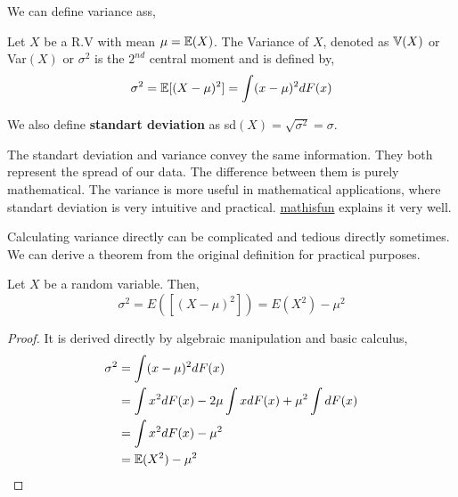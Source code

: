 We can define variance ass,
\begin{definition}
    Let $X$ be a R.V with mean $\mu = {\mathbb{E}}(X)$. The Variance of $X$, denoted as ${\mathbb{V}}(X)$ or  Var$(X)$ or $\sigma ^2$ is the $2^{nd}$ central moment and is defined by,
    \[ \sigma^2 = {\mathbb{E}} [(X- \mu)^2] = \int (x -\mu)^2 dF(x)\]
    
    We also define \textbf{standart deviation} as sd$(X) = \sqrt{\sigma^2}= \sigma$.
\end{definition}
The standart deviation and variance convey the same information. They both represent the spread of our data. 
The difference between them is purely mathematical. The variance is more useful in mathematical applications, where standart deviation is very intuitive and practical. 
\href{https://www.mathsisfun.com/data/standard-deviation.html}{mathisfun} explains it very well.
\par
Calculating variance directly can be complicated  and tedious directly sometimes. We can derive a theorem from the original definition for practical purposes.
\begin{theorem}
    Let $X$ be a random variable. Then,
    \[\sigma^2 = E([ (X-\mu)^2]) = E(X^2) - \mu^2\]
    \begin{proof}
        It is derived directly by algebraic manipulation and basic calculus,
        \begin{align*}
            \sigma^2 &= \int (x- \mu)^2 dF(x)  \\
                     &= \int x^2 dF(x) -2\mu \int x dF(x) + \mu^2 \int dF(x) \\
                     &= \int x^2 dF(x) - \mu^2 \\
                     &= {\mathbb{E}}(X^2) - \mu^2
        \end{align*}
    \end{proof}
\end{theorem}

